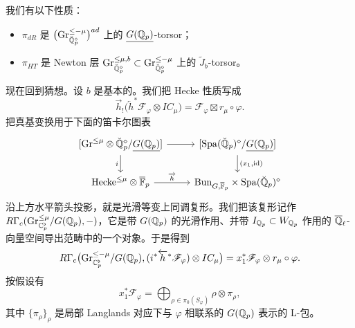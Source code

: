 我们有以下性质：
\begin{itemize}
\item $\pi_{dR}$ 是 $\big(\mathrm{Gr}^{\le-\mu}_{\breve{\mathbb{Q}}_p^{\diamond}}\big)^{ad}$ 上的 $\underline{G(\mathbb{Q}_p)}$-torsor；
\item $\pi_{HT}$ 是 Newton 层 $\mathrm{Gr}^{\le\mu,b}_{\breve{\mathbb{Q}}_p^{\diamond}}\subset\mathrm{Gr}^{\le-\mu}_{\breve{\mathbb{Q}}_p^{\diamond}}$ 上的 $\widetilde{J}_b$-torsor。
\end{itemize}

现在回到猜想。设 $b$ 是基本的。我们把 Hecke 性质写成
\[
\overrightarrow{h}_!\big(\overleftarrow{h}^*\mathscr{F}_{\varphi}\otimes IC_\mu\big)=\mathscr{F}_{\varphi}\boxtimes r_\mu\circ\varphi.
\]
把真基变换用于下面的笛卡尔图表
\begin{equation*}
\begin{tikzcd}
{[\Gr^{\le\mu}\otimes\breve{\QQ}_p^{\diamond}/\ul{G(\QQ_p)}]} \arrow[r] \arrow[d,"i"']
& {[\Spa(\breve{\QQ}_p)^{\diamond}/\ul{G(\QQ_p)}]} \arrow[d,"{(x_1,\id)}"] \\
\mathrm{Hecke}^{\le\mu}\otimes\ol{\FF}_p \arrow[r,"\overrightarrow{h}"]
& \Bun_{G,\ol{\FF}_p}\times\Spa(\breve{\QQ}_p)^{\diamond}
\end{tikzcd}
\end{equation*}
沿上方水平箭头投影，就是光滑等变上同调复形。我们把该复形记作 $R\Gamma_c(\mathrm{Gr}^{\le\mu}_{\mathbb{C}_p^{\flat}}/G(\mathbb{Q}_p),-)$，它是带 $G(\mathbb{Q}_p)$ 的光滑作用、并带 $I_{\mathbb{Q}_p}\subset W_{\mathbb{Q}_p}$ 作用的 $\overline{\mathbb{Q}}_\ell$-向量空间导出范畴中的一个对象。于是得到
\[
R\Gamma_c\big(\mathrm{Gr}^{\le-\mu}_{\mathbb{C}_p^{\flat}}/G(\mathbb{Q}_p),(i^*\overleftarrow{h}^*\mathscr{F}_{\varphi})\otimes IC_\mu\big)=x_1^*\mathscr{F}_{\varphi}\otimes r_\mu\circ\varphi.
\]
按假设有
\[
x_1^*\mathscr{F}_{\varphi}=\bigoplus_{\rho\in\pi_0(S_{\varphi})}\rho\otimes\pi_\rho,
\]
其中 $\{\pi_\rho\}_\rho$ 是局部 Langlands 对应下与 $\varphi$ 相联系的 $G(\mathbb{Q}_p)$ 表示的 L-包。


